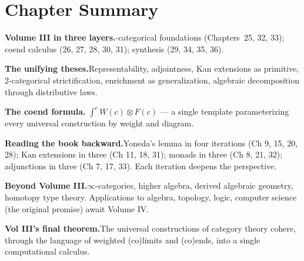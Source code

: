 \begin{exercisesbox}
\begin{qa}
\end{qa}
\end{exercisesbox}


\section*{Chapter Summary}

\begin{summarybox}
\textbf{Volume III in three layers.}-categorical foundations
(Chapters~25, 32, 33); coend calculus (26, 27, 28, 30, 31); synthesis
(29, 34, 35, 36).

\textbf{The unifying theses.}\quad Representability, adjointness, Kan
extensions as primitive, 2-categorical strictification, enrichment as
generalization, algebraic decomposition through distributive laws.

\textbf{The coend formula.}\quad
$\int^c W(c) \otimes F(c)$ — a single template parameterizing every
universal construction by weight and diagram.

\textbf{Reading the book backward.}\quad Yoneda's lemma in four iterations
(Ch 9, 15, 20, 28); Kan extensions in three (Ch 11, 18, 31); monads in
three (Ch 8, 21, 32); adjunctions in three (Ch 7, 17, 33). Each iteration
deepens the perspective.

\textbf{Beyond Volume III.}\quad $\infty$-categories, higher algebra,
derived algebraic geometry, homotopy type theory. Applications to algebra,
topology, logic, computer science (the original promise) await Volume IV.

\textbf{Vol III's final theorem.}\quad The universal constructions of
category theory cohere, through the language of weighted (co)limits and
(co)ends, into a single computational calculus.
\end{summarybox}


